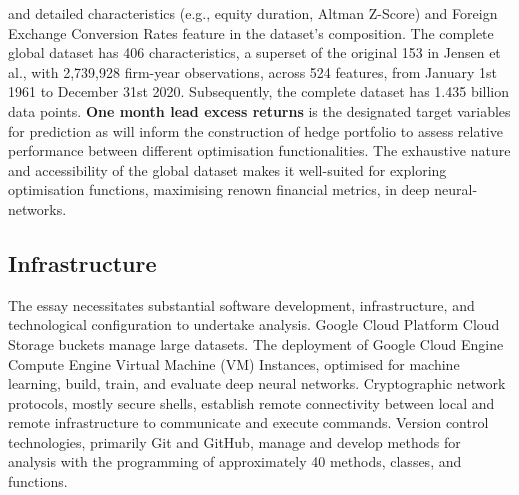\documentclass[10pt]{article}
\begin{document}
and detailed characteristics (e.g., equity duration, Altman Z-Score) and Foreign Exchange Conversion Rates feature in the dataset's composition.
The complete global dataset has 406 characteristics, a superset of the original 153 in Jensen et al., with 2,739,928 firm-year observations, across 524 features, from January 1st 1961 to December 31st 2020.
Subsequently, the complete dataset has 1.435 billion data points. \textbf{One month lead excess returns} is the designated target variables for prediction as will inform the construction of hedge portfolio to
assess relative performance between different optimisation functionalities.
The exhaustive nature and accessibility of the global dataset makes it well-suited for exploring optimisation functions, maximising renown financial metrics, in deep neural-networks.
\subsection{Infrastructure}
The essay necessitates substantial software development, infrastructure, and technological configuration to undertake analysis. 
Google Cloud Platform Cloud Storage buckets manage large datasets.
The deployment of Google Cloud Engine Compute Engine Virtual Machine (VM) Instances, optimised for machine learning, build, train, and evaluate deep neural networks.
Cryptographic network protocols, mostly secure shells, establish remote connectivity between local and remote infrastructure to communicate and execute commands.
Version control technologies, primarily Git and GitHub, manage and develop methods for analysis with the programming of approximately 40 methods, classes, and functions.
\end{document}

